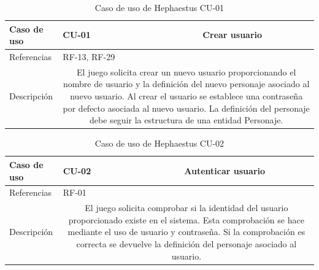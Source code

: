 \begin{table}[H]
	\centering
	\small	
	\begin{tabularx}{\linewidth}{|l|cc|}
		{\cellcolor[HTML]{C0C0C0} Caso de uso} & \multicolumn{1}{l|}{CU-01} & Crear usuario \\ \hline
		{\cellcolor[HTML]{C0C0C0} Referencias} & \multicolumn{2}{l|}{RF-13, RF-29} \\ \hline
		{\cellcolor[HTML]{C0C0C0} Descripción} & \multicolumn{2}{X|}{El juego solicita crear un nuevo usuario proporcionando el nombre de usuario y la definición del nuevo personaje asociado al nuevo usuario. Al crear el usuario se establece una contraseña por defecto asociada al nuevo usuario. La definición del personaje debe seguir la estructura de una entidad Personaje.} \\ \hline
	\end{tabularx}
	
	\vspace{0.5cm}
	\caption{Caso de uso de Hephaestus CU-01}
	\label{tab:hephaestus-cu-01}
\end{table}

\begin{table}[H]
	\centering
	\small
	\begin{tabularx}{\linewidth}{|l|cc|}
		\hline
		{\cellcolor[HTML]{C0C0C0} Caso de uso} & \multicolumn{1}{l|}{CU-02} & Autenticar usuario \\ \hline
		{\cellcolor[HTML]{C0C0C0} Referencias} & \multicolumn{2}{l|}{RF-01} \\ \hline
		{\cellcolor[HTML]{C0C0C0} Descripción} & \multicolumn{2}{X|}{El juego solicita comprobar si la identidad del usuario proporcionado existe en el sistema. Esta comprobación se hace mediante el uso de usuario y contraseña. Si la comprobación es correcta se devuelve la definición del personaje asociado al usuario.} \\ \hline
	\end{tabularx}
	
	\vspace{0.5cm}
	\caption{Caso de uso de Hephaestus CU-02}
	\label{tab:hephaestus-cu-02}
\end{table}

